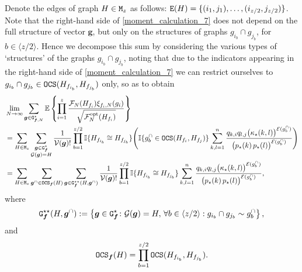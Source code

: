 \documentclass[11pt,reqno]{amsart}
\numberwithin{equation}{section}
\newcommand{\sprod}[1]{\langle#1\rangle}
\newcommand{\E}[1]{\mathbb{E}\left\{ #1\right\}}
\newcommand{\kb}[1]{\boldsymbol{#1}}
\newcommand{\vk}[1]{\kb{#1}}
\begin{document}
{Denote the edges of graph ${H}\in{\tt M}_z$ as follows: ${\tt E}({H}) = \{(i_1,j_1),\ldots,(i_{z/2},j_{z/2})\}$. Note that the right-hand side of \eqref{moment_calculation_7} does not depend on the full structure of vector $\vk g$, but only on the structures of graphs $g_{i_b}\cap g_{j_b}$, for $b\in\sprod{z/2}$. Hence we decompose this sum by considering the various types of `structures' of the graphs {$g_{i_b}\cap g_{j_b}$}, {noting that due to the indicators appearing in the right-hand side of \eqref{moment_calculation_7} we can restrict ourselves to ${g_{i_b}\cap g_{j_b}}\in {\tt OCS}(H_{f_{i_b}}, H_{f_{j_b}})$ only}, so as to obtain 
\begin{align}
    &\lim_{N\to\infty}\sum_{\vk g\in{\tt G}^{\star}_{\vk f,N}}\E{\prod_{i=1}^{z}\frac{\mathcal{F}_{{N}}({H}_{f_i})\xi_{f_i,{N}}(g_i)}{\sqrt{\mathcal{F}^{\rm opt}_N({H}_{f_i})}}}
    \notag\\
     &=\sum_{{H}\in{\tt M}_z}\sum_{\substack{\vk g\in
     {\tt G}^{\star}_{\vk f} \\ \mathcal{G}(\vk g)={H}}}\frac{1}{\mathcal{V}(\vk g)!}\prod_{b=1}^{z/2}\mathbb{I}\{{H}_{f_{i_b}}\cong {H}_{f_{j_b}}\}\Bigg(\mathbb{I}\{g_b^{\cap}\in{\tt OCS}({H}_{f_i},{H}_{f_j})\}\sum_{k,l=1}^{n}\frac{q_{k,i}q_{l,j}\bigl(\kappa_{\star}(k,l)\bigr)^{\mathcal{E}(g_b^{\cap})}}{\bigl(p_{\star}(k)\,p_{\star}(l)\bigr)^{\mathcal{E}(g_b^{\cap})}}\Bigg)\notag\\
     &=\sum_{{H}\in{\tt M}_z}\sum_{\vk g^{\cap}\in{\tt OCS}_{\vk f}({H})}\sum_{\vk g\in
     {\tt G}^{\star\star}_{\vk f}({H},\vk g^{\cap}) }\frac{1}{\mathcal{V}(\vk g)!}\prod_{b=1}^{z/2}\mathbb{I}\{{H}_{f_{i_b}}\cong {H}_{f_{j_b}}\}\sum_{k,l=1}^{n}\frac{q_{k,i}q_{l,j}\bigl(\kappa_{\star}(k,l)\bigr)^{\mathcal{E}(g_b^{\cap})}}{\bigl(p_{\star}(k)\,p_{\star}(l)\bigr)^{\mathcal{E}(g_b^{\cap})}},\label{moment_calculation_7.1}
\end{align}
where
\begin{align*}
    {\tt G}^{\star\star}_{\vk f}({H},\vk g^{\cap}) := \left\{\vk g\in{\tt G}_{\vk f}^{\star}\colon \mathcal{G}(\vk g) = {H},\, \forall b\in\sprod{z/2}:g_{i_b}\cap g_{j_b} \sim g^{\cap}_{b}\right\},
\end{align*}
and 
\begin{align*}
    {\tt OCS}_{\vk f}({H}) = \prod_{b=1}^{z/2}{\tt OCS}({H}_{f_{i_b}},{H}_{f_{j_b}}).
\end{align*}
}
\end{document}
